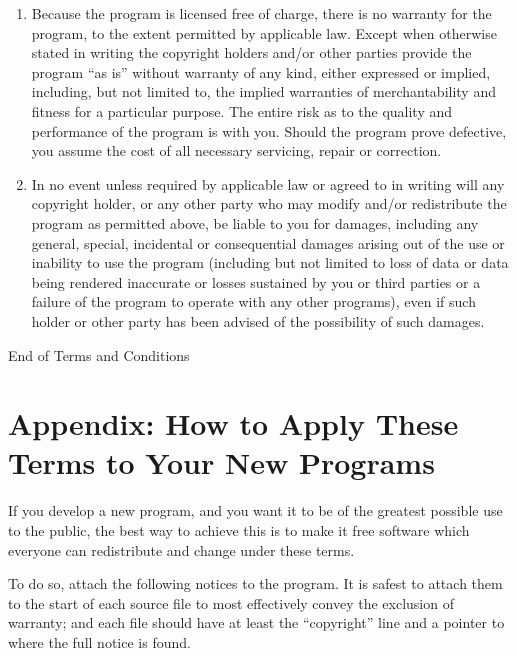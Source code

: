\documentclass[a4paper,11pt,oneside]{book}
\begin{document}
\begin{enumerate}
	\begin{center}
		{\Large\sc
			No Warranty
		}
	\end{center}

	\item
	{\sc Because the program is licensed free of charge, there is no warranty
		for the program, to the extent permitted by applicable law.  Except when
		otherwise stated in writing the copyright holders and/or other parties
		provide the program ``as is'' without warranty of any kind, either expressed
		or implied, including, but not limited to, the implied warranties of
		merchantability and fitness for a particular purpose.  The entire risk as
		to the quality and performance of the program is with you.  Should the
		program prove defective, you assume the cost of all necessary servicing,
		repair or correction.}

	\item
	{\sc In no event unless required by applicable law or agreed to in writing
		will any copyright holder, or any other party who may modify and/or
		redistribute the program as permitted above, be liable to you for damages,
		including any general, special, incidental or consequential damages arising
		out of the use or inability to use the program (including but not limited
		to loss of data or data being rendered inaccurate or losses sustained by
		you or third parties or a failure of the program to operate with any other
		programs), even if such holder or other party has been advised of the
		possibility of such damages.}

\end{enumerate}


\begin{center}
	{\Large\sc End of Terms and Conditions}
\end{center}


\pagebreak[2]

\section*{Appendix: How to Apply These Terms to Your New Programs}

If you develop a new program, and you want it to be of the greatest
possible use to the public, the best way to achieve this is to make it
free software which everyone can redistribute and change under these
terms.

To do so, attach the following notices to the program.  It is safest to
attach them to the start of each source file to most effectively convey
the exclusion of warranty; and each file should have at least the
``copyright'' line and a pointer to where the full notice is found.
\end{document}
